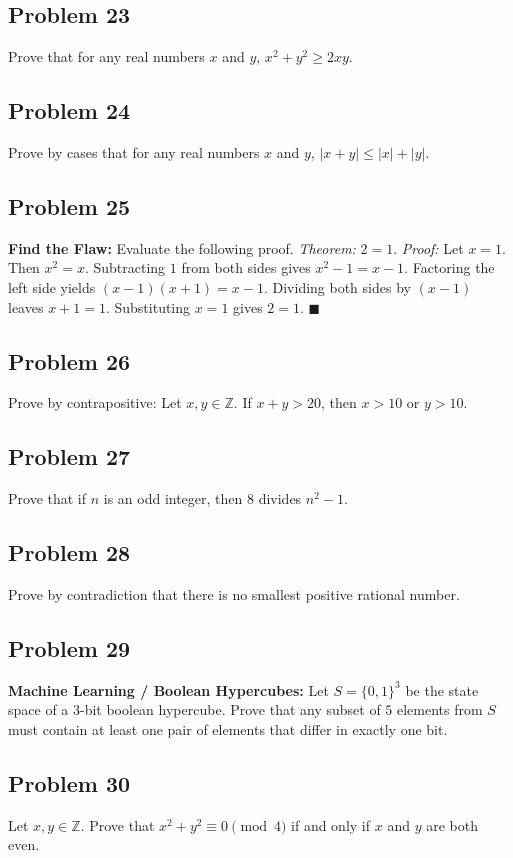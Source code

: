 \documentclass[11pt]{article}
\begin{document}
\subsection{Problem 23}
Prove that for any real numbers $x$ and $y$, $x^2 + y^2 \ge 2xy$.

\subsection{Problem 24}
Prove by cases that for any real numbers $x$ and $y$, $|x+y| \le |x| + |y|$.

\subsection{Problem 25}
\textbf{Find the Flaw:} Evaluate the following proof.
\textit{Theorem:} $2 = 1$.
\textit{Proof:} Let $x = 1$. Then $x^2 = x$. Subtracting $1$ from both sides gives $x^2 - 1 = x - 1$. Factoring the left side yields $(x-1)(x+1) = x-1$. Dividing both sides by $(x-1)$ leaves $x+1 = 1$. Substituting $x=1$ gives $2 = 1$. $\blacksquare$

\subsection{Problem 26}
Prove by contrapositive: Let $x, y \in \mathbb{Z}$. If $x+y > 20$, then $x > 10$ or $y > 10$.

\subsection{Problem 27}
Prove that if $n$ is an odd integer, then $8$ divides $n^2 - 1$.

\subsection{Problem 28}
Prove by contradiction that there is no smallest positive rational number.

\subsection{Problem 29}
\textbf{Machine Learning / Boolean Hypercubes:} Let $S = \{0, 1\}^3$ be the state space of a 3-bit boolean hypercube. Prove that any subset of $5$ elements from $S$ must contain at least one pair of elements that differ in exactly one bit.

\subsection{Problem 30}
Let $x, y \in \mathbb{Z}$. Prove that $x^2 + y^2 \equiv 0 \pmod 4$ if and only if $x$ and $y$ are both even.
\end{document}
